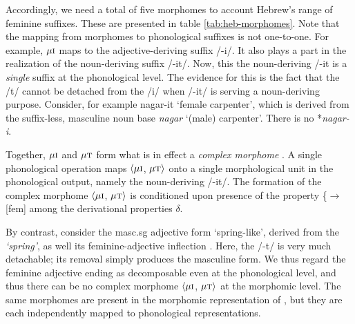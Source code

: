    
  Accordingly, we need a total of five morphomes
  to account Hebrew's range of feminine suffixes. These are presented in table \ref{tab:heb-morphomes}. 
  Note that the mapping from 
  morphomes to phonological suffixes is not one-to-one. For example, 
  $\mu{\textsc{i}}$ maps to the adjective-deriving suffix /-i/. It also 
  plays a part in the realization of the noun-deriving suffix /-it/. Now, 
  this the noun-deriving /-it is a \emph{single} suffix at the phonological 
  level. The evidence for this is the fact that the /t/ cannot be detached 
  from the /i/ when /-it/ is serving a noun-deriving purpose. Consider, for 
  example nagar-it `female carpenter', which is derived from the suffix-less, 
  masculine noun base \emph{nagar} `(male) carpenter'. 
There is no *\emph{nagar-i}.
  
Together, $\mu\textsc{i}$ and $\mu\textsc{t}$ form what is in effect  
a \emph{complex morphome} \citep{round:2015, round:md:2016}. A single 
phonological operation maps $\langle \mu\textsc{i}$, $\mu\textsc{t} \rangle$ 
onto a single morphological unit in the phonological output, namely the 
noun-deriving /-it/. The formation of the complex morphome $\langle \mu\textsc{i}$, 
$\mu\textsc{t} \rangle$ is conditioned upon presence of the 
property \{$\to$[fem] among the derivational properties $\delta$.
 


  By contrast, consider the masc.sg adjective form \emph{} 
  `spring-like', derived from the \emph{ `spring'}, 
  as well its feminine-adjective inflection  \emph{}. Here, the /-t/ 
  is very much detachable; its removal simply produces the masculine form. We
  thus regard the feminine adjective ending as decomposable even at the 
  phonological level, and thus there can be no complex morphome $\langle \mu\textsc{i}$, 
  $\mu\textsc{t} \rangle$ at the morphomic level. The same morphomes are present in the 
  morphomic representation of \emph{}, but they are each 
  independently mapped to phonological representations.
  
